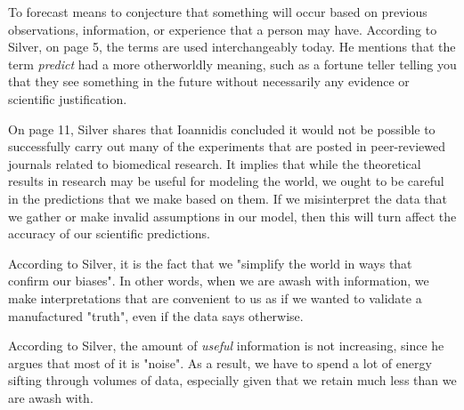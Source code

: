 \documentclass[12pt]{article}
\begin{document}

\begin{enumerate}


To forecast means to conjecture that something will occur based on previous
observations, information, or experience that a person may have. According to
Silver, on page 5, the terms are used interchangeably today. He mentions that
the term \emph{predict} had a more otherworldly meaning, such as a fortune
teller telling you that they see something in the future without necessarily
any evidence or scientific justification.


On page 11, Silver shares that Ioannidis concluded it would not be possible to successfully
carry out many of the experiments that are posted in peer-reviewed journals related to
biomedical research. It implies that while the theoretical results in research may
be useful for modeling the world, we ought to be careful in the predictions that we make
based on them. If we misinterpret the data that we gather or make invalid assumptions
in our model, then this will turn affect the accuracy of our scientific predictions.


According to Silver, it is the fact that we "simplify the world in ways that confirm our
biases". In other words, when we are awash with information, we make interpretations
that are convenient to us as if we wanted to validate a manufactured "truth", even if
the data says otherwise.


According to Silver, the amount of \emph{useful} information is not increasing, since
he argues that most of it is "noise". As a result, we have to spend a lot of energy
sifting through volumes of data, especially given that we retain much less than
we are awash with.



\end{enumerate}
\end{document}
